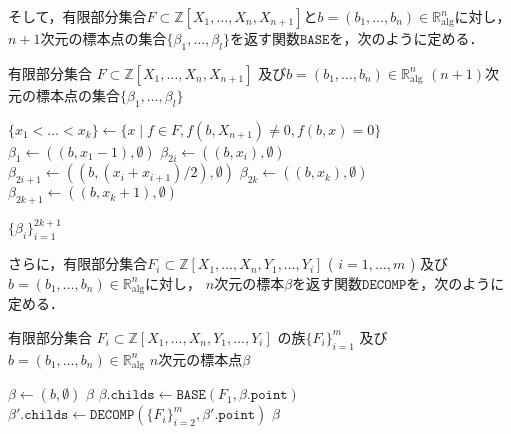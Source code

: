 \documentclass[uplatex, dvipdfmx]{jsarticle}
\numberwithin{equation}{section}
\newcommand{\Ralg}{\mathbb{R}_\mathrm{alg}}
\newcommand{\Z}{\mathbb{Z}}
\theoremstyle{definition}
\begin{document}
そして，有限部分集合$F \subset \Z[X_1, \dots, X_n, X_{n+1}]$と$b=(b_1, \dots, b_n) \in \Ralg^n$に対し，
$n+1$次元の標本点の集合$\{\beta_1, \dots, \beta_l\}$を返す関数$\mathtt{BASE}$を，次のように定める．
\begin{algorithm}[H]
     \caption {$\mathtt{BASE}(F, b)$}
     \begin{algorithmic}[1]
          \REQUIRE 
               有限部分集合
               $F \subset \Z[X_1, \dots, X_n, X_{n+1}]$
               及び$b = (b_1, \dots, b_n) \in \Ralg^n$
          \ENSURE 
               $(n+1)$次元の標本点の集合$\{\beta_1, \dots, \beta_l\}$

          \STATE $\{x_1 < \dots < x_k\} \leftarrow \{x \mid f \in F, f(b, X_{n+1}) \neq 0,  f(b, x) = 0\}$
          \STATE $\beta_1 \leftarrow ((b, x_1 - 1), \emptyset)$
               \STATE $\beta_{2i} \leftarrow ((b, x_i), \emptyset)$
               \STATE $\beta_{2i+1} \leftarrow ((b, (x_i+x_{i+1})/2), \emptyset)$
          \ENDFOR
          \STATE $\beta_{2k} \leftarrow ((b, x_k), \emptyset)$
          \STATE $\beta_{2k+1} \leftarrow ((b, x_k+1), \emptyset)$
     
          \RETURN $\{\beta_i\}_{i=1}^{2k+1}$
     \end{algorithmic}
\end{algorithm}

さらに，有限部分集合$F_i \subset \Z[X_1, \dots, X_n, Y_1, \dots, Y_i]$ ( $i=1, \dots, m$ ) 
及び$b=(b_1, \dots, b_n) \in \Ralg^n$に対し，
$n$次元の標本$\beta$を返す関数$\mathtt{DECOMP}$を，次のように定める．

\begin{algorithm}[H]
     \caption {$\mathtt{DECOMP}(\{F_i\}_{i=1}^m, b)$}
     \begin{algorithmic}[1]
          \REQUIRE 
               有限部分集合
               $F_i \subset \Z[X_1, \dots, X_n, Y_1, \dots, Y_i]$
               の族$\{F_i\}_{i=1}^m$ 
               及び$b=(b_1, \dots, b_n) \in \Ralg^n$
          \ENSURE 
               $n$次元の標本点$\beta$

          \STATE $\beta \leftarrow(b, \emptyset)$
               \RETURN $\beta$
          \ENDIF
               \STATE $\beta.\mathtt{childs} \leftarrow \mathtt{BASE}(F_1, \beta.\mathtt{point})$
                    \STATE $\beta'.\mathtt{childs} \leftarrow \mathtt{DECOMP}(\{F_i\}_{i=2}^m, \beta'.\mathtt{point})$
               \ENDFOR
          \RETURN $ \beta $
     \end{algorithmic}
\end{algorithm}
\end{document}
